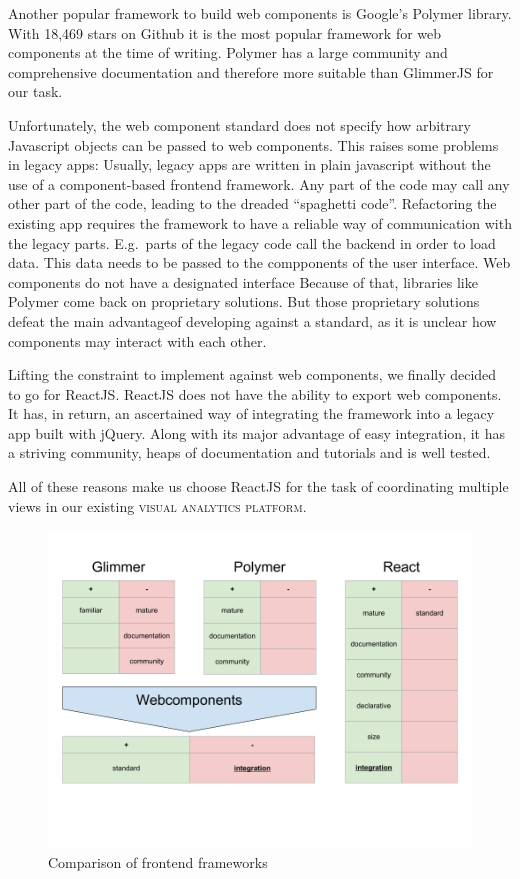 \documentclass{article}
\newcommand{\visan}{\textsc{visual analytics platform}}
\begin{document}
Another popular framework to build web components is Google's Polymer library\cite{Polymer2017}.
With 18,469 stars on Github it is the most popular framework for web components at the time of writing.
Polymer has a large community and comprehensive documentation and therefore more suitable than GlimmerJS for our task.

Unfortunately, the web component standard does not specify how arbitrary Javascript objects can be passed to web components.
This raises some problems in legacy apps:
Usually, legacy apps are written in plain javascript without the use of a component-based frontend framework.
Any part of the code may call any other part of the code, leading to the dreaded ``spaghetti code''.
Refactoring the existing app requires the framework to have a reliable way of communication with the legacy parts.
E.g.\ parts of the legacy code call the backend in order to load data.
This data needs to be passed to the compponents of the user interface.
Web components do not have a designated interface
Because of that, libraries like Polymer come back on proprietary solutions.
But those proprietary solutions defeat the main advantageof developing against a standard, as it is unclear how components may interact with each other.

Lifting the constraint to implement against web components, we finally decided to go for ReactJS\cite{React2017}.
ReactJS does not have the ability to export web components.
It has, in return, an ascertained way of integrating the framework into a legacy app built with jQuery.
Along with its major advantage of easy integration, it has a striving community, heaps of documentation and tutorials and is well tested.

All of these reasons make us choose ReactJS for the task of coordinating multiple views in our existing \visan{}.




\begin{figure}[h!]
  \centering
  \includegraphics[width=\textwidth]{images/frontend-frameworks.png}
  \caption{Comparison of frontend frameworks}\label{fig:implementation:frontend-frameworks}
\end{figure}
\end{document}
